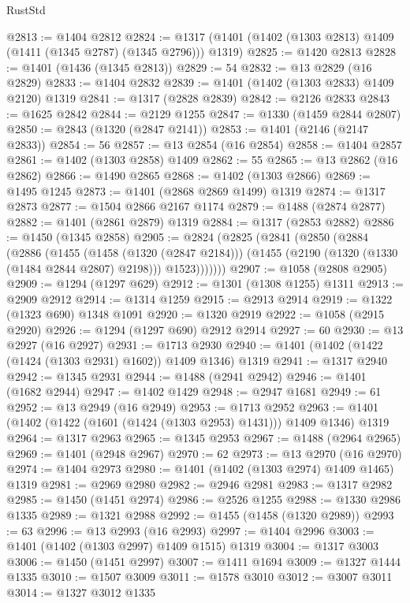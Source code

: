 \begin{lexlean}{RustStd}
\begin{coremodule}
{\begin{coremodule}
{{{{{{{{{{{{{{{{{{{{{{{{{{{{{{{{{{{{{{@2813 := @1404 @2812
@2824 := @1317 (@1401 (@1402 (@1303 @2813) @1409 (@1411 (@1345 @2787) (@1345 @2796))) @1319)
@2825 := @1420 @2813
@2828 := @1401 (@1436 (@1345 @2813))
@2829 := 54
@2832 := @13 @2829 (@16 @2829)
@2833 := @1404 @2832
@2839 := @1401 (@1402 (@1303 @2833) @1409 @2120) @1319
@2841 := @1317 (@2828 @2839)
@2842 := @2126 @2833
@2843 := @1625 @2842
@2844 := @2129 @1255
@2847 := @1330 (@1459 @2844 @2807)
@2850 := @2843 (@1320 (@2847 @2141))
@2853 := @1401 (@2146 (@2147 @2833))
@2854 := 56
@2857 := @13 @2854 (@16 @2854)
@2858 := @1404 @2857
@2861 := @1402 (@1303 @2858) @1409
@2862 := 55
@2865 := @13 @2862 (@16 @2862)
@2866 := @1490 @2865
@2868 := @1402 (@1303 @2866)
@2869 := @1495 @1245
@2873 := @1401 (@2868 @2869 @1499) @1319
@2874 := @1317 @2873
@2877 := @1504 @2866 @2167 @1174
@2879 := @1488 (@2874 @2877)
@2882 := @1401 (@2861 @2879) @1319
@2884 := @1317 (@2853 @2882)
@2886 := @1450 (@1345 @2858)
@2905 := @2824
    (@2825
      (@2841
        (@2850
          (@2884
            (@2886
              (@1455
                (@1458 (@1320 (@2847 @2184)))
                (@1455 (@2190 (@1320 (@1330 (@1484 @2844 @2807) @2198))) @1523)))))))
@2907 := @1058 (@2808 @2905)
@2909 := @1294 (@1297 @629)
@2912 := @1301 (@1308 @1255) @1311
@2913 := @2909 @2912
@2914 := @1314 @1259
@2915 := @2913 @2914
@2919 := @1322 (@1323 @690) @1348 @1091
@2920 := @1320 @2919
@2922 := @1058 (@2915 @2920)
@2926 := @1294 (@1297 @690) @2912 @2914
@2927 := 60
@2930 := @13 @2927 (@16 @2927)
@2931 := @1713 @2930
@2940 := @1401 (@1402 (@1422 (@1424 (@1303 @2931) @1602)) @1409 @1346) @1319
@2941 := @1317 @2940
@2942 := @1345 @2931
@2944 := @1488 (@2941 @2942)
@2946 := @1401 (@1682 @2944)
@2947 := @1402 @1429
@2948 := @2947 @1681
@2949 := 61
@2952 := @13 @2949 (@16 @2949)
@2953 := @1713 @2952
@2963 := @1401 (@1402 (@1422 (@1601 (@1424 (@1303 @2953) @1431))) @1409 @1346) @1319
@2964 := @1317 @2963
@2965 := @1345 @2953
@2967 := @1488 (@2964 @2965)
@2969 := @1401 (@2948 @2967)
@2970 := 62
@2973 := @13 @2970 (@16 @2970)
@2974 := @1404 @2973
@2980 := @1401 (@1402 (@1303 @2974) @1409 @1465) @1319
@2981 := @2969 @2980
@2982 := @2946 @2981
@2983 := @1317 @2982
@2985 := @1450 (@1451 @2974)
@2986 := @2526 @1255
@2988 := @1330 @2986 @1335
@2989 := @1321 @2988
@2992 := @1455 (@1458 (@1320 @2989))
@2993 := 63
@2996 := @13 @2993 (@16 @2993)
@2997 := @1404 @2996
@3003 := @1401 (@1402 (@1303 @2997) @1409 @1515) @1319
@3004 := @1317 @3003
@3006 := @1450 (@1451 @2997)
@3007 := @1411 @1694
@3009 := @1327 @1444 @1335
@3010 := @1507 @3009
@3011 := @1578 @3010
@3012 := @3007 @3011
@3014 := @1327 @3012 @1335
}}}}}}}}}}}}}}}}}}}}}}}}}}}}}}}}}}}}}}
\end{coremodule}}
\end{coremodule}
\end{lexlean}
